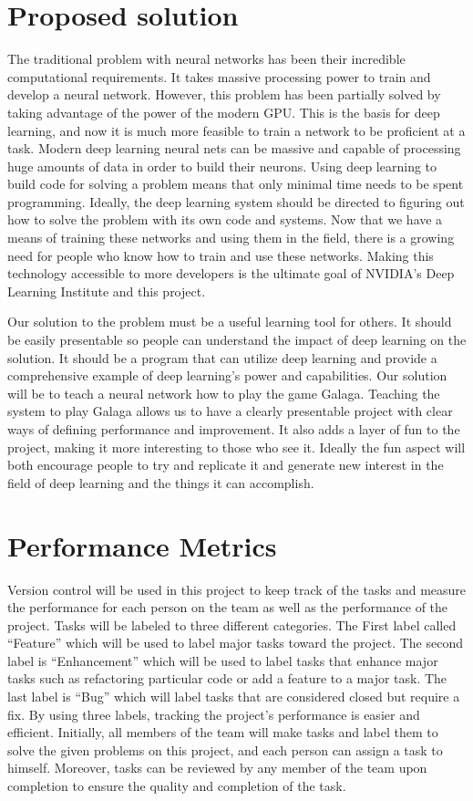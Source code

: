 \documentclass{scrreprt}
\begin{document}
\section{Proposed solution}
The traditional problem with neural networks has been their incredible computational requirements.
 It takes massive processing power to train and develop a neural network.
 However, this problem has been partially solved by taking advantage of the power of the modern GPU.
 This is the basis for deep learning, and now it is much more feasible to train a network to be proficient at a task.
 Modern deep learning neural nets can be massive and capable of processing huge amounts of data in order to build their neurons.
 Using deep learning to build code for solving a problem means that only minimal time needs to be spent programming.
 Ideally, the deep learning system should be directed to figuring out how to solve the problem with its own code and systems.
 Now that we have a means of training these networks and using them in the field, there is a growing need for people who know how to train and use these networks.
 Making this technology accessible to more developers is the ultimate goal of NVIDIA's Deep Learning Institute and this project.


Our solution to the problem must be a useful learning tool for others.
It should be easily presentable so people can understand the impact of deep learning on the solution.
 It should be a program that can utilize deep learning and provide a comprehensive example of deep learning's power and capabilities.
 Our solution will be to teach a neural network how to play the game Galaga.
 Teaching the system to play Galaga allows us to have a clearly presentable project with clear ways of defining performance and improvement.
 It also adds a layer of fun to the project, making it more interesting to those who see it.
 Ideally the fun aspect will both encourage people to try and replicate it and generate new interest in the field of deep learning and the things it can accomplish.


\section{Performance Metrics}
Version control will be used in this project to keep track of the tasks and measure the performance for each person on the team as well as the performance of the project.
 Tasks will be labeled to three different categories.
 The First label called “Feature” which will be used to label major tasks toward the project.
 The second label is “Enhancement” which will be used to label tasks that enhance major tasks such as refactoring particular code or add a feature to a major task.
 The last label is “Bug” which will label tasks that are considered closed but require a fix.
 By using three labels, tracking the project’s performance is easier and efficient.
 Initially, all members of the team will make tasks and label them to solve the given problems on this project, and each person can assign a task to himself.
 Moreover, tasks can be reviewed by any member of the team upon completion to ensure the quality and completion of the task.
\end{document}

